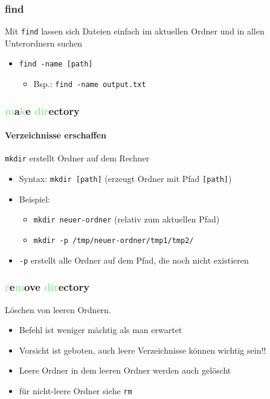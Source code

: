 \documentclass[12pt,utf8]{beamer}
\begin{document}
\begin{frame}
	\frametitle{find}
	Mit \texttt{find} lassen sich Dateien einfach im aktuellen Ordner und in allen Unterordnern suchen
	\begin{itemize}
		\item \texttt{find -name [path]}
		\begin{itemize}[<+->]
			\item Bsp.: \texttt{find -name output.txt}
		\end{itemize}
	\end{itemize}
\end{frame}

\begin{frame}
\frametitle{\textcolor{lightGreen}{m}a\textcolor{lightGreen}{k}e \textcolor{lightGreen}{dir}ectory}
\framesubtitle{Verzeichnisse erschaffen}
\texttt{mkdir} erstellt Ordner auf dem Rechner
\begin{itemize}
	\item Syntax: \texttt{mkdir [path]}   (erzeugt Ordner mit Pfad \texttt{[path]})
	\item Beispiel:
	\begin{itemize}[<+->]
		\item \texttt{mkdir neuer-ordner}    (relativ zum aktuellen Pfad)
		\item \texttt{mkdir -p /tmp/neuer-ordner/tmp1/tmp2/}
	\end{itemize}
	\item \texttt{-p}   erstellt alle Ordner auf dem Pfad, die noch nicht existieren
\end{itemize}
\end{frame}

\begin{frame}
\frametitle{\textcolor{lightGreen}{r}e\textcolor{lightGreen}{m}ove \textcolor{lightGreen}{dir}ectory}
Löschen von leeren Ordnern.
\begin{itemize}
	\item Befehl ist weniger mächtig als man erwartet
	\item Vorsicht ist geboten, auch leere Verzeichnisse können wichtig sein!!
	\item Leere Ordner in dem leeren Ordner werden auch gelöscht
	\item für nicht-leere Ordner siehe \texttt{rm}
\end{itemize}
\end{frame}
\end{document}
